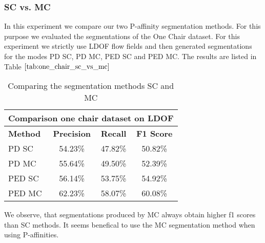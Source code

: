 \subsubsection{SC vs. MC}
In this experiment we compare our two P-affinity segmentation methods. For this purpose we evaluated the segmentations of the One Chair dataset. For this experiment we strictly use LDOF flow fields and then generated segmentations for the modes PD SC, PD MC, PED SC and PED MC. The results are listed in Table $\ref{tab:one_chair_sc_vs_mc}$
\begin{table}[H]
\centering
\begin{tabular}{|l|c|c|c|}
\hline
\multicolumn{4}{|c|}{Comparison one chair dataset on LDOF}                        \\ \hline
\textbf{Method} & \textbf{Precision} & \textbf{Recall} & \textbf{F1 Score}  \\ \hline
PD SC & 54.23\% & 47.82\% & 50.82\% \\ \hline
PD MC & 55.64\% & 49.50\% & 52.39\% \\ \hline
PED SC & 56.14\% & 53.75\% & 54.92\% \\ \hline
PED MC & 62.23\% & 58.07\% & 60.08\% \\ \hline              
\end{tabular}
\caption[SC vs. MC]{Comparing the segmentation methods SC and MC} 
\label{tab:one_chair_sc_vs_mc}
\end{table}
We observe, that segmentations produced by MC always obtain higher f1 scores than SC methods. It seems benefical to use the MC segmentation method when using P-affinities.

